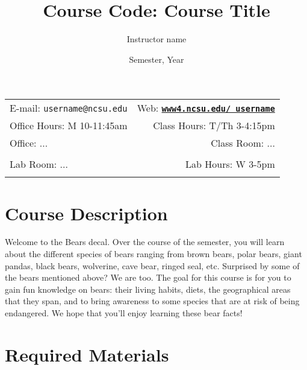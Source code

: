 \documentclass[11pt]{article}
\title{Course Code: Course Title}
\author{Instructor name}
\date{Semester, Year}
\newcommand{\blankline}{\quad\pagebreak[2]}
\begin{document}
\maketitle

\blankline

\begin{tabular*}{.93\textwidth}{@{\extracolsep{\fill}}lr}


E-mail: \texttt{username@ncsu.edu} & Web: \href{www4.ncsu.edu/~username}{\tt\bf www4.ncsu.edu/~username}  \\

 Office Hours: M 10-11:45am  &  Class Hours: T/Th 3-4:15pm \\

 Office: ... & Class Room: ... \\
 & \\
Lab Room: ... & Lab Hours: W 3-5pm \\
&  \\
\hline
\end{tabular*}

\vspace{5 mm}


\section*{Course Description}

Welcome to the Bears decal. Over the course of the semester, you will learn about the different species of bears ranging from brown bears, polar bears, giant pandas, black bears, wolverine, cave bear, ringed seal, etc. Surprised by some of the bears mentioned above? We are too. The goal for this course is for you to gain fun knowledge on bears: their living habits, diets, the geographical areas that they span, and to bring awareness to some species that are at risk of being endangered. We hope that you'll enjoy learning these bear facts! 

\bigskip

\noindent 


\section*{Required Materials}
\end{document}
